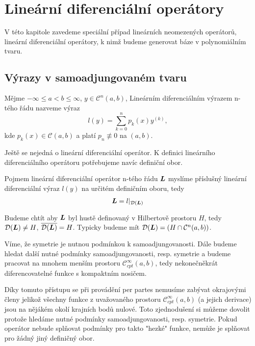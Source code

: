 \section{Lineární diferenciální operátory}

V této kapitole zavedeme speciální případ lineárních neomezených operátorů, lineární diferenciální operátory, k nimž budeme generovat báze v polynomiálním tvaru.

\subsection{Výrazy v samoadjungovaném tvaru}

\begin{definition}
Mějme $-\infty \leq a < b \leq \infty$, $y \in \mathcal{C}^n (a, b)$, 
Lineárním diferenciálním výrazem n-tého řádu nazveme výraz
\begin{equation}
    l(y) = \sum_{k=0}^{n} p_k (x) y^{(k)},
\end{equation}
kde $p_k(x) \in \mathcal{C}(a, b)$ a platí $p_n \not\equiv 0$ na $(a, b)$.
\end{definition}

\begin{remark}
    Ještě se nejedná o lineární diferenciální operátor. K definici lineárního diferenciálního operátoru potřebujeme navíc definiční obor.
\end{remark}

\begin{definition}
Pojmem lineární diferenciální operátor n-tého řádu $\boldsymbol{L}$ myslíme příslušný lineární
diferenciální výraz $l(y)$ na určitém definičním oboru, tedy
\begin{align*}
    \boldsymbol{L} = l \rvert_{\mathcal{D}(\boldsymbol{L})}
\end{align*}
\end{definition}

Budeme chtít aby $\boldsymbol{L}$ byl hustě definovaný v Hilbertově prostoru $H$, tedy $\mathcal{D}(\boldsymbol{L}) \neq H$, $\overline{\mathcal{D}(\boldsymbol{L})} = H$.
Typicky budeme mít $\mathcal{D}(\boldsymbol{L}) = \left(H \cap \mathcal{C}^n (a,b)\right)$.

Víme, že symetrie je nutnou podmínkou k samoadjungovanosti. Dále budeme hledat další
nutné podmínky samoadjungovanosti, resp. symetrie a budeme pracovat na mnohem menším prostoru $\mathcal{C}^{\infty}_{cpt} (a,b)$, tedy nekonečněkrát diferencovatelné funkce
s kompaktním nosičem.
\begin{remark}
    Díky tomuto přístupu se při provádění per partes nemusíme zabývat okrajovými členy
    jelikož všechny funkce z uvažovaného prostoru $\mathcal{C}^{\infty}_{cpt} (a,b)$ (a jejich derivace) jsou na nějákém okolí krajních bodů nulové. Toto zjednodušení si můžeme dovolit protože hledáme nutné podmínky samoadjungovanosti, resp. symetrie. Pokud operátor nebude splňovat podmínky pro takto "hezké" funkce, nemůže je splňovat pro žádný jiný definičný obor.
\end{remark}

